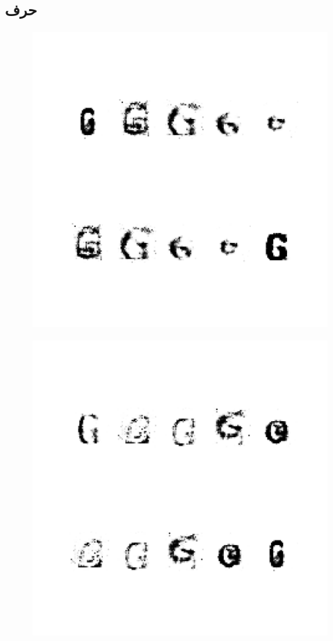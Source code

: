 \documentclass{article}
\begin{document}
\subsection{حرف }
\begin{figure}[H]
	\centerline{\includegraphics[width=\textwidth , height=\textheight ]{../results/CGAN_Adam/figs/letters/G/95.pdf}}
\end{figure}
\begin{figure}[H]
	\centerline{\includegraphics[width=\textwidth , height=\textheight ]{../results/CGAN_Adam/figs/letters/G/90.pdf}}
\end{figure}
\end{document}
